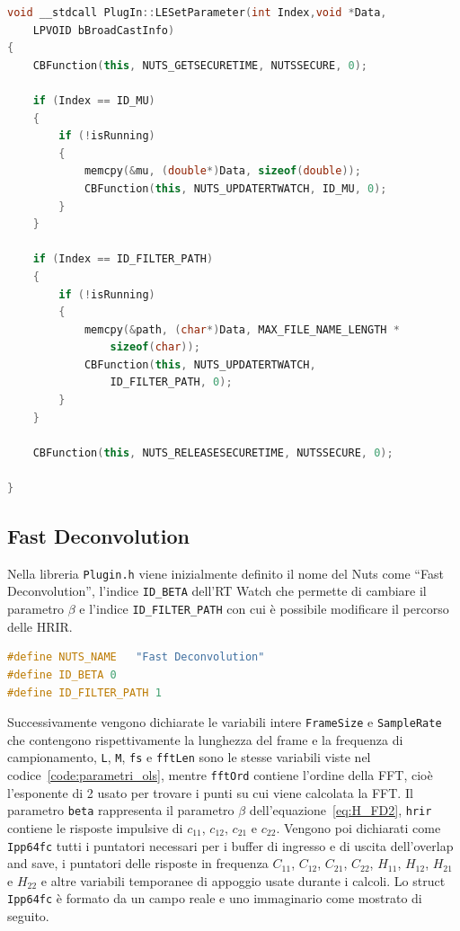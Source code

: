 \documentclass[12pt,a4paper,titlepage]{article}
\begin{document}
\begin{lstlisting}[language=cpp, label=code:set_rtwatch_lms, caption = Funzione \texttt{LESetParameter}, breaklines = false, captionpos = b]
void __stdcall PlugIn::LESetParameter(int Index,void *Data,
	LPVOID bBroadCastInfo)
{
	CBFunction(this, NUTS_GETSECURETIME, NUTSSECURE, 0);

	if (Index == ID_MU)
	{
		if (!isRunning)
		{
			memcpy(&mu, (double*)Data, sizeof(double));
			CBFunction(this, NUTS_UPDATERTWATCH, ID_MU, 0);
		}
	}
	
	if (Index == ID_FILTER_PATH)
	{
		if (!isRunning)
		{
			memcpy(&path, (char*)Data, MAX_FILE_NAME_LENGTH * 
				sizeof(char));
			CBFunction(this, NUTS_UPDATERTWATCH, 
				ID_FILTER_PATH, 0);
		}
	}

	CBFunction(this, NUTS_RELEASESECURETIME, NUTSSECURE, 0);

}
\end{lstlisting}


\subsection{Fast Deconvolution}
\label{subsec:codice_c_fd}
Nella libreria \texttt{Plugin.h} viene inizialmente definito il nome del Nuts come ``Fast Deconvolution'', l'indice \texttt{ID\_BETA} dell'RT Watch che permette di cambiare il parametro $\beta$  e l'indice  \texttt{ID\_FILTER\_PATH} con cui è possibile modificare il percorso delle HRIR.

\begin{lstlisting}[language=cpp, label=code:costanti_c, caption = Dichiarazione delle costanti in \texttt{Plugin.h},captionpos = b]
#define NUTS_NAME	"Fast Deconvolution"
#define ID_BETA 0
#define ID_FILTER_PATH 1
\end{lstlisting}

Successivamente vengono dichiarate le variabili intere \texttt{FrameSize} e \texttt{SampleRate} che contengono rispettivamente la lunghezza del frame e la frequenza di campionamento, \texttt{L}, \texttt{M}, \texttt{fs} e \texttt{fftLen} sono le stesse variabili viste nel codice~\ref{code:parametri_ols}, mentre \texttt{fftOrd} contiene l'ordine della FFT, cioè l'esponente di 2 usato per trovare i punti su cui viene calcolata la FFT. Il parametro \texttt{beta} rappresenta il parametro $\beta$ dell'equazione~\eqref{eq:H_FD2}, \texttt{hrir} contiene le risposte impulsive di $c_{11}$, $c_{12}$, $c_{21}$ e $c_{22}$. Vengono poi dichiarati come \texttt{Ipp64fc} tutti i puntatori necessari per i buffer di ingresso e di uscita dell'overlap and save, i puntatori delle risposte in frequenza  $C_{11}$, $C_{12}$, $C_{21}$, $C_{22}$, $H_{11}$, $H_{12}$, $H_{21}$ e $H_{22}$ e altre variabili temporanee di appoggio usate durante i calcoli. Lo struct \texttt{Ipp64fc} è formato da un campo reale e uno immaginario come mostrato di seguito.
\end{document}
